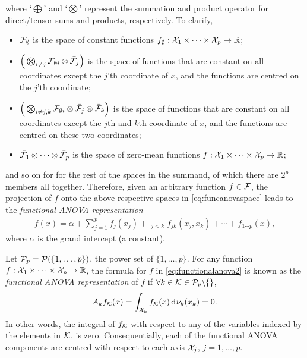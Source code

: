 where `$\bigoplus$' and `$\bigotimes$' represent the summation and product operator for direct/tensor sums and products, respectively. 
To clarify,
\begin{itemize}
  \item ${\mathcal F}_{\emptyset}$ is the space of constant functions $f_\emptyset:{\mathcal X}_1\times\cdots\times{\mathcal X}_p\to\mathbb{R}$;
  \item $\Big( \bigotimes_{i\neq j}{\mathcal F}_{\emptyset i} \otimes \bar{{\mathcal F}}_j \Big)$ is the space of functions that are constant on all coordinates except the $j$'th coordinate of $x$, and the functions are centred on the $j$'th coordinate;
  \item $\Big( \bigotimes_{i\neq j,k}{\mathcal F}_{\emptyset i} \otimes \bar{{\mathcal F}}_j \otimes \bar{{\mathcal F}}_k \Big)$ is the space of functions that are constant on all coordinates except the $j$th and $k$th coordinate of $x$, and the functions are centred on these two coordinates;
  \item $\bar{{\mathcal F}}_1 \otimes \cdots \otimes \bar{{\mathcal F}}_p$ is the space of zero-mean functions $f:{\mathcal X}_1\times\cdots\times{\mathcal X}_p\to\mathbb{R}$;
\end{itemize}
and so on for for the rest of the spaces in the summand, of which there are $2^p$ members all together. 
Therefore, given an arbitrary function $f\in{\mathcal F}$, the projection of $f$ onto the above respective 
spaces in \cref{eq:funcanovaspace} leads to the \emph{functional ANOVA representation}
\begin{align}\label{eq:functionalanova2}
  f(x) = \alpha + \sum_{j=1}^p f_j(x_j) + \mathop{\sum_{j,k=1}^p}_{j<k} f_{jk}(x_j,x_k) + \cdots + f_{1\cdots p}(x),
\end{align}
where $\alpha$ is the grand intercept (a constant).

\begin{definition}
  Let ${\mathcal P}_p = {\mathcal P}(\{1,\dots,p\})$, the power set of $\{1,\dots,p\}$.
  For any function $f:{\mathcal X}_1\times\cdots\times{\mathcal X}_p\to\mathbb{R}$, the formula for $f$ in \cref{eq:functionalanova2} is known as the \emph{functional ANOVA representation} of $f$ if $\forall k \in {\mathcal K} \in {\mathcal P}_p \backslash \{ \}$,
  \begin{align}\label{eq:funcanovaorth}
    A_k f_{\mathcal K}(x) = \int_{{\mathcal X}_k} f_{\mathcal K}(x) \operatorname{d}\hspace{0.5pt}\!\nu_k(x_k) = 0.
  \end{align}
  In other words, the integral of $f_{\mathcal K}$ with respect to any of the variables indexed by the elements in ${\mathcal K}$, is zero. 
  Consequentially, each of the functional ANOVA components are centred with respect to each axis ${\mathcal X}_j$, $j=1,\dots,p$.
\end{definition}


